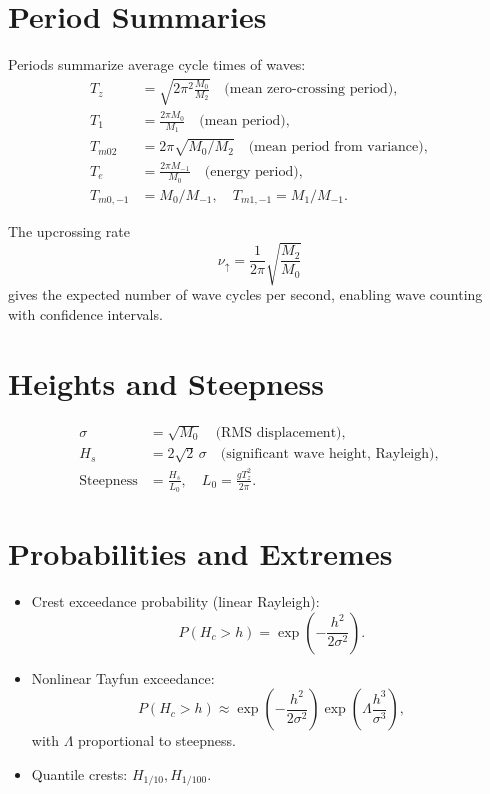 \documentclass[11pt]{article}
\begin{document}
\section{Period Summaries}

Periods summarize average cycle times of waves:
\begin{align}
T_z &= \sqrt{2\pi^2 \tfrac{M_0}{M_2}} \quad \text{(mean zero-crossing period)}, \\
T_1 &= \tfrac{2\pi M_0}{M_1} \quad \text{(mean period)}, \\
T_{m02} &= 2\pi\sqrt{M_0/M_2} \quad \text{(mean period from variance)}, \\
T_e &= \tfrac{2\pi M_{-1}}{M_0} \quad \text{(energy period)}, \\
T_{m0,-1} &= M_0/M_{-1}, \quad
T_{m1,-1} = M_1/M_{-1}.
\end{align}

The upcrossing rate
\[
\nu_{\uparrow} = \frac{1}{2\pi}\sqrt{\frac{M_2}{M_0}}
\]
gives the expected number of wave cycles per second, enabling wave counting with confidence intervals.

\section{Heights and Steepness}

\begin{align}
\sigma &= \sqrt{M_0} \quad \text{(RMS displacement)}, \\
H_s &= 2\sqrt{2}\,\sigma \quad \text{(significant wave height, Rayleigh)}, \\
\text{Steepness} &= \frac{H_s}{L_0}, \quad L_0 = \frac{g T_z^2}{2\pi}.
\end{align}

\section{Probabilities and Extremes}

\begin{itemize}
  \item Crest exceedance probability (linear Rayleigh):
  \[
  P(H_c > h) = \exp\!\left(-\frac{h^2}{2\sigma^2}\right).
  \]
  \item Nonlinear Tayfun exceedance:
  \[
  P(H_c > h) \approx \exp\!\left(-\frac{h^2}{2\sigma^2}\right)\exp\!\left(\Lambda \frac{h^3}{\sigma^3}\right),
  \]
  with $\Lambda$ proportional to steepness.
  \item Quantile crests: $H_{1/10}, H_{1/100}$.
\end{itemize}
\end{document}
